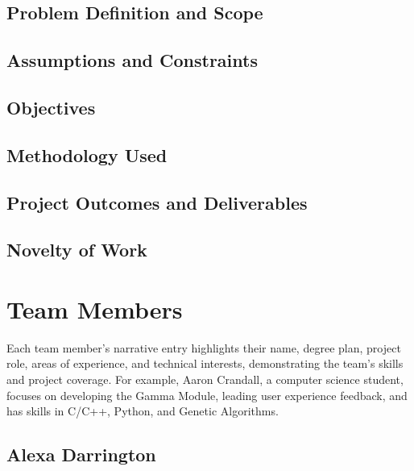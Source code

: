 \documentclass{article}
\begin{document}
    \subsection{Problem Definition and Scope}

    \subsection{Assumptions and Constraints}

    \subsection{Objectives}

    \subsection{Methodology Used}

    \subsection{Project Outcomes and Deliverables}

    \subsection{Novelty of Work}


\newpage


\section{Team Members}

Each team member's narrative entry highlights their name, degree plan, project role, areas of experience, and technical interests, demonstrating the team's skills and project coverage. For example, Aaron Crandall, a computer science student, focuses on developing the Gamma Module, leading user experience feedback, and has skills in C/C++, Python, and Genetic Algorithms. 

    \subsection{Alexa Darrington}
\end{document}

